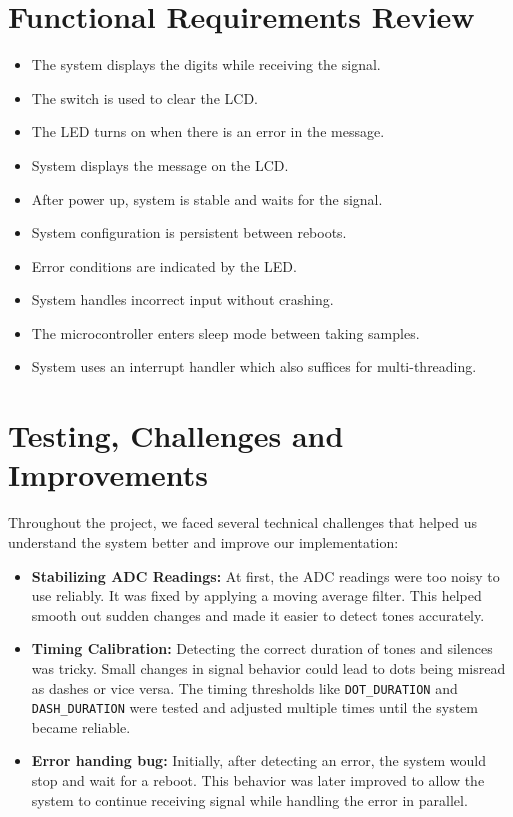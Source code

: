 \documentclass{article}
\begin{document}
\section{Functional Requirements Review}
\begin{itemize}
    \item The system displays the digits while receiving the signal.
    \item The switch is used to clear the LCD.
    \item The LED turns on when there is an error in the message.
    \item System displays the message on the LCD.
    \item After power up, system is stable and waits for the signal.
    \item System configuration is persistent between reboots.
    \item Error conditions are indicated by the LED.
    \item System handles incorrect input without crashing.
    \item The microcontroller enters sleep mode between taking samples.
    \item System uses an interrupt handler which also suffices for multi-threading.
\end{itemize}


\section{Testing, Challenges and Improvements}
Throughout the project, we faced several technical challenges that helped us understand 
the system better and improve our implementation:

\begin{itemize}

     
    \item \textbf{Stabilizing ADC Readings:} At first, the ADC readings were too noisy to use reliably. 
    It was fixed by applying a moving average filter. This helped smooth out sudden changes 
    and made it easier to detect tones accurately.

    
    \item \textbf{Timing Calibration:} Detecting the correct duration of tones and silences was tricky. 
    Small changes in signal behavior could lead to dots being misread as dashes or vice versa. 
    The timing thresholds like \texttt{DOT\_DURATION} and \texttt{DASH\_DURATION}  were tested and adjusted
    multiple times until the system became reliable.
    
    \item \textbf{Error handing bug:} Initially, after detecting an error, the system would stop and wait for a reboot.
    This behavior was later improved to allow the system to continue receiving signal 
    while handling the error in parallel.  

      
\end{itemize}
\end{document}
